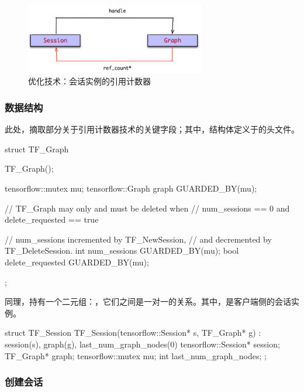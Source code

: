 \begin{content}
\begin{figure}[!htbp]
\centering
\includegraphics[width=0.7\textwidth]{figures/tf-graph-session-relation.png}
\caption{优化技术：会话实例的引用计数器}
 \label{fig:tf-graph-session-relation}
\end{figure}

\subsubsection{数据结构}

此处，摘取部分关于引用计数器技术的关键字段；其中，结构体定义于的头文件。

\begin{leftbar}
\begin{c++}
struct TF_Graph {
  TF_Graph();

  tensorflow::mutex mu;
  tensorflow::Graph graph GUARDED_BY(mu);

  // TF\_Graph may only and must be deleted when
  // num\_sessions == 0 and delete\_requested == true

  // num\_sessions incremented by TF\_NewSession, 
  // and decremented by TF\_DeleteSession.
  int num_sessions GUARDED_BY(mu);
  bool delete_requested GUARDED_BY(mu);
};
\end{c++}
\end{leftbar}

同理，持有一个二元组：，它们之间是一对一的关系。其中，是客户端侧的会话实例。

\begin{leftbar}
\begin{c++}
struct TF_Session {
  TF_Session(tensorflow::Session* s, TF_Graph* g)
      : session(s), graph(g), last_num_graph_nodes(0) {}
  tensorflow::Session* session;
  TF_Graph* graph;
  tensorflow::mutex mu;
  int last_num_graph_nodes;
};
\end{c++}
\end{leftbar}

\subsubsection{创建会话}


\end{content}
